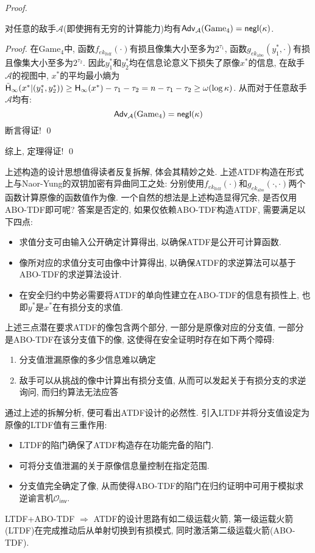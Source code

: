 \begin{proof}
\begin{claim}
    对任意的敌手$\mathcal{A}$(即使拥有无穷的计算能力)均有$\mathsf{Adv}_\mathcal{A}(\text{Game}_4) = \mathsf{negl}(\kappa)$. 
\end{claim}

\begin{proof}
在$\text{Game}_4$中, 函数$f_{ek_\text{ltdf}}(\cdot)$有损且像集大小至多为$2^{\tau_1}$, 
函数$g_{ek_\text{abo}}(y_1^*, \cdot)$有损且像集大小至多为$2^{\tau_2}$. 
因此$y_1^*$和$y_2^*$均在信息论意义下损失了原像$x^*$的信息, 
在敌手$\mathcal{A}$的视图中, $x^*$的平均最小熵为
$\tilde{\mathsf{H}}_\infty(x^*|(y_1^*, y_2^*)) \geq \mathsf{H}_\infty(x^*) - \tau_1 - \tau_2 = n - \tau_1 - \tau_2 \geq \omega(\log \kappa)$. 
从而对于任意敌手$\mathcal{A}$均有: 
\begin{equation*}
    \mathsf{Adv}_\mathcal{A}(\text{Game}_4) = \mathsf{negl}(\kappa)
\end{equation*}
断言得证! \qed
\end{proof}
综上, 定理得证! \qed
\end{proof}

\begin{remark}
上述构造的设计思想值得读者反复拆解, 体会其精妙之处. 
上述ATDF构造在形式上与Naor-Yung的双钥加密有异曲同工之处: 
分别使用$f_{ek_\text{ltdf}}(\cdot)$和$g_{ek_\text{abo}}(\cdot, \cdot)$两个函数计算原像的函数值作为像.  
一个自然的想法是上述构造显得冗余, 是否仅用ABO-TDF即可呢? 答案是否定的, 如果仅依赖ABO-TDF构造ATDF, 需要满足以下四点: 
\begin{itemize} 
	\item 求值分支可由输入公开确定计算得出, 以确保ATDF是公开可计算函数.
	\item 像所对应的求值分支可由像中计算得出, 以确保ATDF的求逆算法可以基于ABO-TDF的求逆算法设计. 
	\item 在安全归约中势必需要将ATDF的单向性建立在ABO-TDF的信息有损性上, 也即$y^*$是$x^*$在有损分支的求值.
\end{itemize}
上述三点潜在要求ATDF的像包含两个部分, 一部分是原像对应的分支值, 一部分是ABO-TDF在该分支值下的像, 这使得在安全证明时存在如下两个障碍:
\begin{enumerate}
	\item 分支值泄漏原像的多少信息难以确定 
	\item 敌手可以从挑战的像中计算出有损分支值, 从而可以发起关于有损分支的求逆询问, 而归约算法无法应答
\end{enumerate} 

通过上述的拆解分析, 便可看出ATDF设计的必然性. 引入LTDF并将分支值设定为原像的LTDF值有三重作用:
\begin{itemize} 
	\item LTDF的陷门确保了ATDF构造存在功能完备的陷门.
	\item 可将分支值泄漏的关于原像信息量控制在指定范围.  
	\item 分支值完全确定了像, 从而使得ABO-TDF的陷门在归约证明中可用于模拟求逆谕言机$\mathcal{O}_\mathsf{inv}$.  
\end{itemize} 
LTDF+ABO-TDF $\Rightarrow$ ATDF的设计思路有如二级运载火箭, 第一级运载火箭(LTDF)在完成推动后从单射切换到有损模式, 
同时激活第二级运载火箭(ABO-TDF).  
\end{remark}

